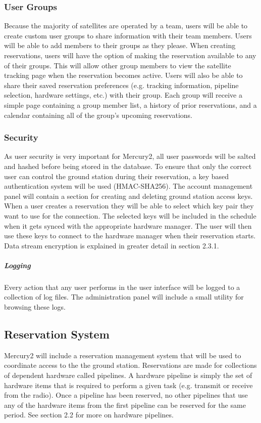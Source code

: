 \documentclass{mxl-design}
\begin{document}
\subsubsection{User Groups}
Because the majority of satellites are operated by a team, users will be able to create custom user groups to share information with their team members. Users will be able to add members to their groups as they please. When creating reservations, users will have the option of making the reservation available to any of their groups. This will allow other group members to view the satellite tracking page when the reservation becomes active. Users will also be able to share their saved reservation preferences (e.g. tracking information, pipeline selection, hardware settings, etc.) with their group. Each group will receive a simple page containing a group member list, a history of prior reservations, and a calendar containing all of the group's upcoming reservations.

\subsubsection{Security}
As user security is very important for Mercury2, all user passwords will be salted and hashed before being stored in the database. To ensure that only the correct user can control the ground station during their reservation, a key based authentication system will be used (HMAC-SHA256). The account management panel will contain a section for creating and deleting ground station access keys. When a user creates a reservation they will be able to select which key pair they want to use for the connection. The selected keys will be included in the schedule when it gets synced with the appropriate hardware manager. The user will then use these keys to connect to the hardware manager when their reservation starts. Data stream encryption is explained in greater detail in section 2.3.1.

\subparagraph{Logging}
Every action that any user performs in the user interface will be logged to a collection of log files. The administration panel will include a small utility for browsing these logs. 

\subsection{Reservation System}
Mercury2 will include a reservation management system that will be used to coordinate access to the the ground station. Reservations are made for collections of dependent hardware called pipelines. A hardware pipeline is simply the set of hardware items that is required to perform a given task (e.g. transmit or receive from the radio). Once a pipeline has been reserved, no other pipelines that use any of the hardware items from the first pipeline can be reserved for the same period. See section 2.2 for more on hardware pipelines.
\end{document}
